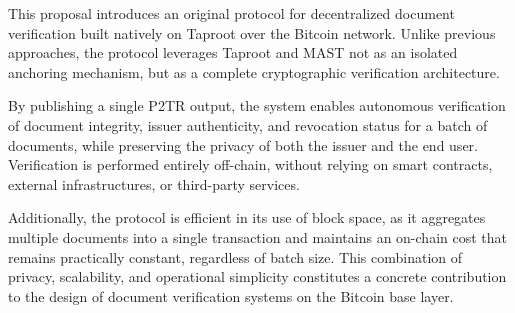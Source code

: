 This proposal introduces an original protocol for decentralized document verification built natively on Taproot over the Bitcoin network. Unlike previous approaches, the protocol leverages Taproot and MAST not as an isolated anchoring mechanism, but as a complete cryptographic verification architecture.

By publishing a single P2TR output, the system enables autonomous verification of document integrity, issuer authenticity, and revocation status for a batch of documents, while preserving the privacy of both the issuer and the end user. Verification is performed entirely off-chain, without relying on smart contracts, external infrastructures, or third-party services.

Additionally, the protocol is efficient in its use of block space, as it aggregates multiple documents into a single transaction and maintains an on-chain cost that remains practically constant, regardless of batch size. This combination of privacy, scalability, and operational simplicity constitutes a concrete contribution to the design of document verification systems on the Bitcoin base layer.


